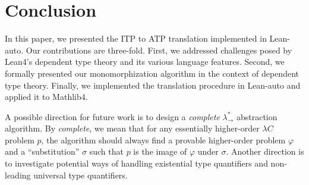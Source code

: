 \section{Conclusion}

In this paper, we presented the ITP to ATP translation implemented in Lean-auto.
Our contributions are three-fold. First, we addressed challenges posed by
Lean4's dependent type theory and its various language features. Second, we formally
presented our monomorphization algorithm in the context of dependent type theory.
Finally, we implemented the translation procedure in Lean-auto and applied it to Mathlib4.

A possible direction for future work is to design a \textit{complete} $\lambda_\to^*$
abstraction algorithm. By \textit{complete}, we mean that for any essentially
higher-order $\lambda C$ problem $p$, the algorithm should always find a provable
higher-order problem $\varphi$ and a ``substitution'' $\sigma$ such that $p$
is the image of $\varphi$ under $\sigma$. Another direction is to investigate
potential ways of handling existential type quantifiers and non-leading universal
type quantifiers.